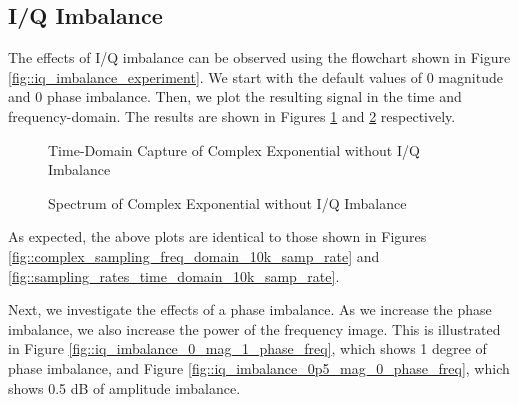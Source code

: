\documentclass{article}
\begin{document}
\subsection{I/Q Imbalance}

The effects of I/Q imbalance can be observed using the flowchart shown in Figure \ref{fig::iq_imbalance_experiment}. We start with the default values of 0 magnitude and 0 phase imbalance. Then, we plot the resulting signal in the time and frequency-domain. The results are shown in Figures \ref{fig::iq_imbalance_0_mag_0_phase_time} and \ref{fig::iq_imbalance_0_mag_0_phase_freq} respectively. 

\begin{figure}[H]
	\centerline{}
	\caption{Time-Domain Capture of Complex Exponential without I/Q Imbalance}
	\label{fig::iq_imbalance_0_mag_0_phase_time}
\end{figure}

\begin{figure}[H]
	\centerline{}
	\caption{Spectrum of Complex Exponential without I/Q Imbalance}
	\label{fig::iq_imbalance_0_mag_0_phase_freq}
\end{figure}

As expected, the above plots are identical to those shown in Figures \ref{fig::complex_sampling_freq_domain_10k_samp_rate} and \ref{fig::sampling_rates_time_domain_10k_samp_rate}.

Next, we investigate the effects of a phase imbalance. As we increase the phase imbalance, we also increase the power of the frequency image. This is illustrated in Figure \ref{fig::iq_imbalance_0_mag_1_phase_freq}, which shows 1 degree of phase imbalance, and Figure \ref{fig::iq_imbalance_0p5_mag_0_phase_freq}, which shows 0.5 dB of amplitude imbalance.
\end{document}
